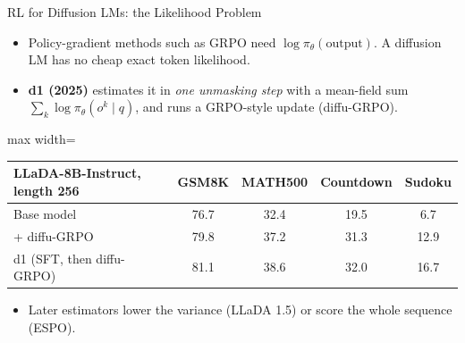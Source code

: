 \begin{frame}{RL for Diffusion LMs: the Likelihood Problem}
    \begin{itemize}\itemsep0.35em
        \item Policy-gradient methods such as GRPO need $\log \pi_\theta(\text{output})$. A diffusion LM has no cheap exact token likelihood.
        \item \textbf{d1 (2025)} estimates it in \emph{one unmasking step} with a mean-field sum $\sum_k \log\pi_\theta(o^k\mid q)$, and runs a GRPO-style update (diffu-GRPO).
    \end{itemize}
    \begin{center}
    \small
    \begin{adjustbox}{max width=\linewidth}\begin{tabular}{lcccc}
        \toprule
        \textbf{LLaDA-8B-Instruct, length 256} & \textbf{GSM8K} & \textbf{MATH500} & \textbf{Countdown} & \textbf{Sudoku} \\
        \midrule
        Base model & 76.7 & 32.4 & 19.5 & 6.7 \\
        + diffu-GRPO & 79.8 & 37.2 & 31.3 & 12.9 \\
        \rowcolor{KAUSTcyan!12} d1 (SFT, then diffu-GRPO) & 81.1 & 38.6 & 32.0 & 16.7 \\
        \bottomrule
    \end{tabular}\end{adjustbox}
    \end{center}
    \begin{itemize}\itemsep0.35em
        \item Later estimators lower the variance (LLaDA 1.5) or score the whole sequence (ESPO).
    \end{itemize}
\end{frame}

